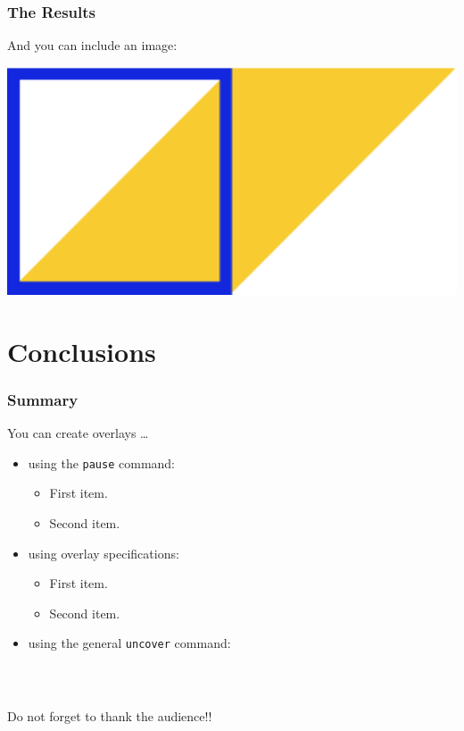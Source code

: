 \documentclass[11pt]{beamer}
\begin{document}
\begin{frame}          %
\frametitle{The Results}
And you can include an image: 
\bigskip
\begin{center}
\includegraphics[scale=.7]{EDSDLogo}
\end{center}
\end{frame}

\section{Conclusions}   %

\begin{frame}          %
\frametitle{Summary}
You can create overlays \dots
\begin{itemize}
\setlength\itemsep{1.2em}	
\item using the \texttt{pause} command:
	\begin{itemize}
	\setlength\itemsep{0.5em}	
	\item First item.
	\pause
	\item Second item.
	\end{itemize}
\item using overlay specifications:
	\begin{itemize}
	\setlength\itemsep{0.5em}	
	\item<3-> First item.
	\item<4-> Second item.
	\end{itemize}
\item<5-> using the general \texttt{uncover} command:
	\begin{itemize}
	\setlength\itemsep{0.5em}	
	\end{itemize}
\end{itemize}

\end{frame}

\begin{frame}          %
\frametitle{$\,$}
\vspace{0.1cm}
\begin{center}
	\begin{LARGE}
		Do not forget to thank the audience!!
	\end{LARGE}
\end{center}
\bigskip
\end{frame}
\end{document}
